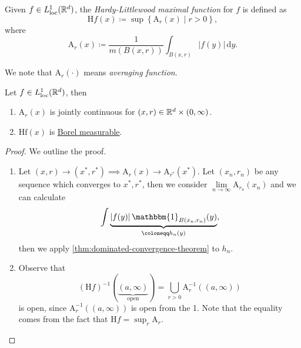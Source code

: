 \begin{definition}\label{def:HL-maximal-function}
	Given \(f\in L^1_{\text{loc} }(\mathbb{\MakeUppercase{r}} ^d)\), the \emph{Hardy-Littlewood maximal function} for \(f\) is defined as
	\[
		\mathrm{H}f(x) \coloneqq \sup \left\{\mathrm{A}_r(x)\mid r > 0\right\},
	\]
	where
	\[
		\mathrm{A}_r(x) \coloneqq \frac{1}{m(B(x, r))}\int _{B(x, r)} \left\vert f(y) \right\vert \,\mathrm{d}y.
	\]
\end{definition}
\begin{note}
	We note that \(\mathrm{A}_r(\cdot) \) means \emph{averaging function}.
\end{note}
\begin{lemma}\label{lma:lec21}
	Let \(f\in L^1_{\text{loc} }(\mathbb{\MakeUppercase{r}} ^d)\), then
	\begin{enumerate}
		\item \(\mathrm{A}_r(x)\) is jointly continuous for \((x, r)\in \mathbb{\MakeUppercase{r}} ^d \times (0, \infty )\).
		\item \(\mathrm{Hf}(x) \) is \hyperref[def:Borel-measurable]{Borel measurable}.
	\end{enumerate}
\end{lemma}
\begin{proof}
	We outline the proof.
	\begin{enumerate}
		\item Let \((x, r)\to (x^\ast, r^\ast)\implies \mathrm{A}_r(x)\to \mathrm{A}_{r^\ast}(x^\ast)\). Let \((x_{n} , r_{n} )\) be any sequence which converges to
		      \(x^\ast, r^\ast\), then we consider \(\lim\limits_{n \to \infty} \mathrm{A}_{r_{n} }(x_{n} )\) and we can calculate
		      \[
			      \int\underbrace{\left\vert f(y) \right\vert \mathbbm{1}_{B(x_{n} , r_{n} )} (y)}_{\coloneqq h_{n} (y)},
		      \]
		      then we apply \autoref{thm:dominated-convergence-theorem} to \(h_{n} \).
		\item Observe that
		      \[
			      (\mathrm{H}f)^{-1} (\underbrace{(a, \infty )}_{\text{open} }) = \bigcup\limits_{r>0} \mathrm{A}_{r} ^{-1} \left((a, \infty )\right)
		      \]
		      is open, since \(\mathrm{A} _{r} ^{-1} \left((a, \infty )\right)\) is open from the 1. Note that the equality comes from the fact that \(\mathrm{H}f = \sup_{r} \mathrm{A} _{r} \).
	\end{enumerate}
\end{proof}

